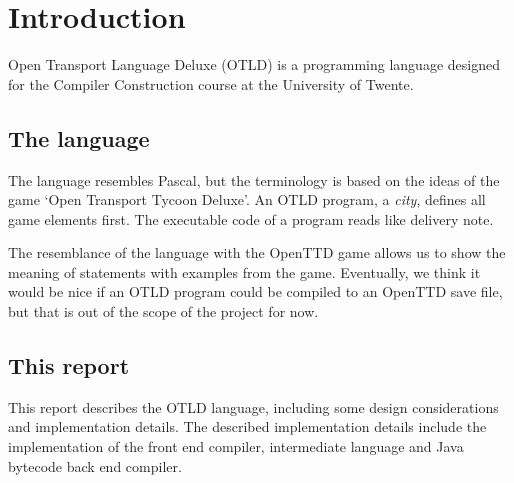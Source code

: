 \chapter{Introduction}

Open Transport Language Deluxe (OTLD) is a programming language designed for the Compiler Construction course at the University of Twente.

\section{The language}

The language resembles Pascal, but the terminology is based on the ideas of the game `Open Transport Tycoon Deluxe'.
An OTLD program, a \emph{city}, defines all game elements first. The executable code of a program reads like delivery note.

The resemblance of the language with the OpenTTD game allows us to show the meaning of statements with examples from the game. Eventually, we think it would be nice if an OTLD program could be compiled to an OpenTTD save file, but that is out of the scope of the project for now.

\section{This report}

This report describes the OTLD language, including some design considerations and implementation details. The described implementation details include the implementation of the front end compiler, intermediate language and Java bytecode back end compiler.
